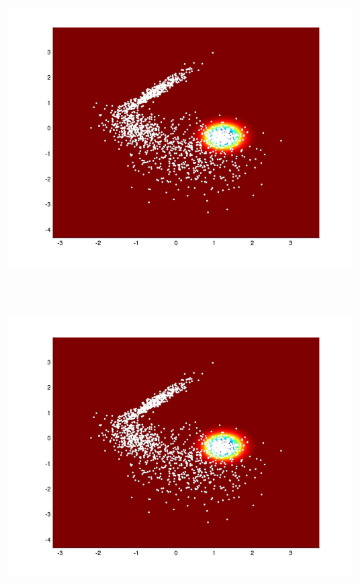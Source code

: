 \documentclass[useAMS,usenatbib,fleqn]{mn2e}
\begin{document}
  
\begin{figure}
        \centering
        \begin{subfigure}[b]{90 px}
                \includegraphics[trim = 150px 100px 150px 70px, clip=true,width=\textwidth]{global1.jpg}
        \end{subfigure}
        ~
         \begin{subfigure}[b]{90 px}
                \includegraphics[trim = 150px 100px 150px 70px, clip=true,width=\textwidth]{VL1.jpg}
        \end{subfigure}
        ~
        \begin{subfigure}[b]{90 px}

\end{subfigure}
\end{figure}
\end{document}
